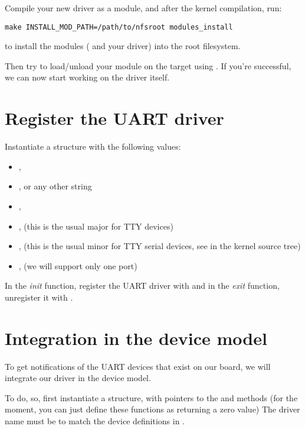 Compile your new driver as a module, and after the kernel compilation, run:

\begin{verbatim}
make INSTALL_MOD_PATH=/path/to/nfsroot modules_install
\end{verbatim}

to install the modules ( and your driver) into the
root filesystem.

Then try to load/unload your module on the target
using . If you're successful, we can now start working
on the driver itself.

\section{Register the UART driver}

Instantiate a  structure with the following values:

\begin{itemize}
\item {}, 
\item {},  or any other string
\item {}, 
\item {},  (this is the usual major for TTY devices)
\item {},  (this is the usual minor for TTY serial
  devices, see  in the kernel source tree)
\item {},  (we will support only one port)
\end{itemize}

In the \emph{init} function, register the UART driver with
 and in the \emph{exit} function,
unregister it with .

\section{Integration in the device model}

To get notifications of the UART devices that exist on our board, we
will integrate our driver in the device model.

To do, so, first instantiate a  structure, with
pointers to the  and  methods (for the 
moment, you can just define these functions as returning a zero value)
The driver name must be  to match the device definitions in
.

